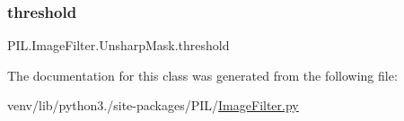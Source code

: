 \subsubsection{\texorpdfstring{threshold}{threshold}}
{\footnotesize\ttfamily P\+I\+L.\+Image\+Filter.\+Unsharp\+Mask.\+threshold}



The documentation for this class was generated from the following file\+:\begin{DoxyCompactItemize}
\item 
venv/lib/python3./site-\/packages/\+P\+I\+L/\hyperlink{ImageFilter_8py}{Image\+Filter.\+py}\end{DoxyCompactItemize}
